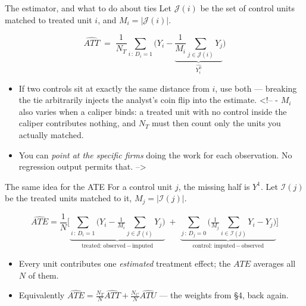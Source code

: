 \documentclass[
  11pt,
  ignorenonframetext,
  aspectratio=169,
]{beamer}
\providecommand{\tightlist}{%
  \setlength{\itemsep}{0pt}\setlength{\parskip}{0pt}}
\begin{document}
\begin{frame}{The estimator, and what to do about ties}
\protect{}\label{the-estimator-and-what-to-do-about-ties}
Let \(\mathcal{J}(i)\) be the set of control units matched to treated
unit \(i\), and \(M_i = |\mathcal{J}(i)|\).

\[
\widehat{ATT} \;=\; \frac{1}{N_T}\sum_{i\,:\,D_i = 1}
\Bigg( Y_i - \underbrace{\frac{1}{M_i}\sum_{j \in \mathcal{J}(i)} Y_j}_{\widehat{Y^0_i}} \Bigg)
\]

\begin{itemize}
\tightlist
\item
  If two controls sit at exactly the same distance from \(i\), use both
  --- breaking the tie arbitrarily injects the analyst's coin flip into
  the estimate. \textless!-- - \(M_i\) also varies when a caliper binds:
  a treated unit with no control inside the caliper contributes nothing,
  and \(N_T\) must then count only the units you actually matched.
\item
  You can \emph{point at the specific firms} doing the work for each
  observation. No regression output permits that. --\textgreater{}
\end{itemize}
\end{frame}

\begin{frame}{The same idea for the ATE}
\protect{}\label{the-same-idea-for-the-ate}
For a control unit \(j\), the missing half is \(Y^1\). Let
\(\mathcal{I}(j)\) be the treated units matched to it,
\(M_j = |\mathcal{I}(j)|\).

\[
\widehat{ATE} = \frac{1}{N}\Bigg[
\underbrace{\sum_{i\,:\,D_i=1}\Big( Y_i - \tfrac{1}{M_i}\!\!\sum_{j \in \mathcal{J}(i)}\!\! Y_j \Big)}_{\text{treated: observed} \,-\, \text{imputed}}
\;+\;
\underbrace{\sum_{j\,:\,D_j=0}\Big( \tfrac{1}{M_j}\!\!\sum_{i \in \mathcal{I}(j)}\!\! Y_i - Y_j \Big)}_{\text{control: imputed} \,-\, \text{observed}}
\Bigg]
\]

\begin{itemize}
\tightlist
\item
  Every unit contributes one \emph{estimated} treatment effect; the
  \(ATE\) averages all \(N\) of them.
\item
  Equivalently
  \(\widehat{ATE} = \frac{N_T}{N}\widehat{ATT} + \frac{N_C}{N}\widehat{ATU}\)
  --- the weights from §4, back again.
\end{itemize}
\end{frame}
\end{document}
